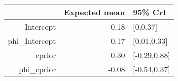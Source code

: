 \begin{tabular}{rrl}
  \hline
 & Expected mean & 95\% CrI \\ 
  \hline
Intercept & 0.18 & [0,0.37] \\ 
  phi\_Intercept & 0.17 & [0.01,0.33] \\ 
  cprior & 0.30 & [-0.29,0.88] \\ 
  phi\_cprior & -0.08 & [-0.54,0.37] \\ 
   \hline
\end{tabular}

